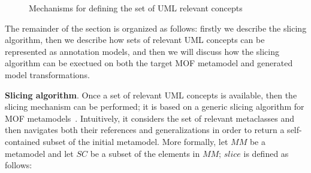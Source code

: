 \begin{figure}
	\hspace{2mm}
  \caption{Mechanisms for defining the set of UML relevant concepts}
  \label{fig:slicingIdea}
\end{figure}
%

The remainder of the section is organized as follows: firstly we describe the slicing algorithm, then we describe how sets of relevant UML concepts can be 
represented as annotation models, and then we will discuss how the slicing algorithm can be exectued on both the target MOF metamodel and generated model transformations.

\textbf{Slicing algorithm}. Once a set of relevant UML concepts is available, then the slicing mechanism can be performed;
it is based on a generic slicing algorithm for MOF metamodels~\cite{ICSEbyadl}. Intuitively,
it considers the set of relevant metaclasses and then navigates both their references and generalizations in order
to return a self-contained subset of the initial metamodel. 
More formally, let $MM$ be a metamodel and let $SC$ be a subset of the elements in
$MM$; $slice$ is defined as follows:

